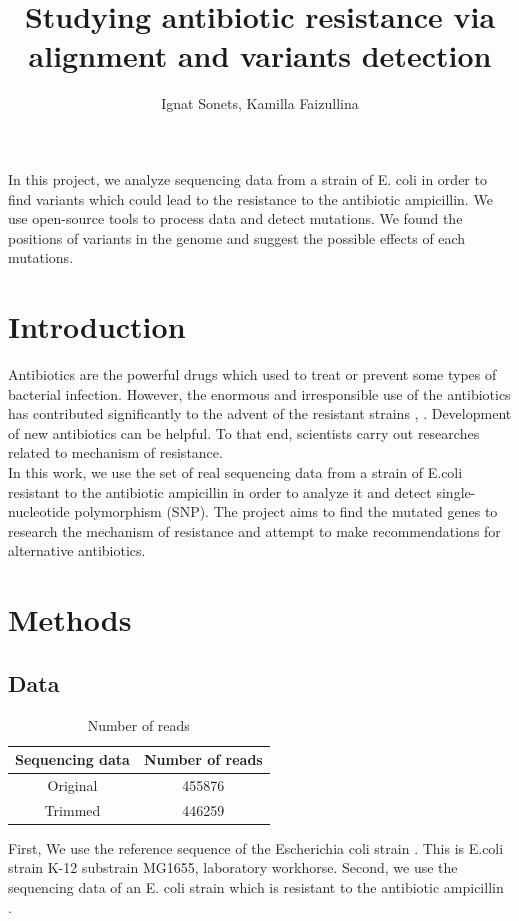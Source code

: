 \documentclass{article}
\title{Studying antibiotic resistance via alignment and variants detection}
\author{  Ignat Sonets, Kamilla Faizullina}
\date{\empty}
\begin{document}
\maketitle
In this project, we analyze sequencing data from a strain of E. coli in order to find variants which could lead to the resistance to the antibiotic ampicillin. We use open-source tools to process data and detect mutations. We found the positions of variants in the genome and suggest the possible effects of each mutations. 

\section{Introduction}
Antibiotics are the powerful drugs which used to treat or prevent some types of bacterial infection. However, the enormous and irresponsible use of the antibiotics  has contributed significantly to the advent of the resistant strains \cite{anti}, \cite{anti2}. Development of new antibiotics can be helpful. To that end, scientists carry out researches related to mechanism of resistance. 
\\
In this work, we use the set of real sequencing data from a strain of E.coli resistant to the antibiotic ampicillin in order to analyze it and detect single-nucleotide polymorphism (SNP). The project aims to find the mutated genes to research the mechanism of resistance and attempt to  make recommendations for alternative antibiotics. 
 
\section{Methods}
\subsection{Data}

\begin{table}[h!]
	\centering
	\begin{tabular}{||c c ||} 
		\hline
		Sequencing data  &  Number of reads    \\ [0.5ex] 
		\hline\hline
		Original  & 455876    \\ 
		Trimmed & 446259 \\ [1ex] 
		\hline
	\end{tabular}
	\caption{Number of reads }
	\label{table:reads}
\end{table}



First, We use the reference  sequence of the  Escherichia coli strain \cite{datalink}. This is E.coli strain K-12 substrain MG1655, laboratory workhorse.  Second, we use the sequencing data of an E. coli strain which is resistant to the antibiotic ampicillin \cite{datalink_res}.
\end{document}
